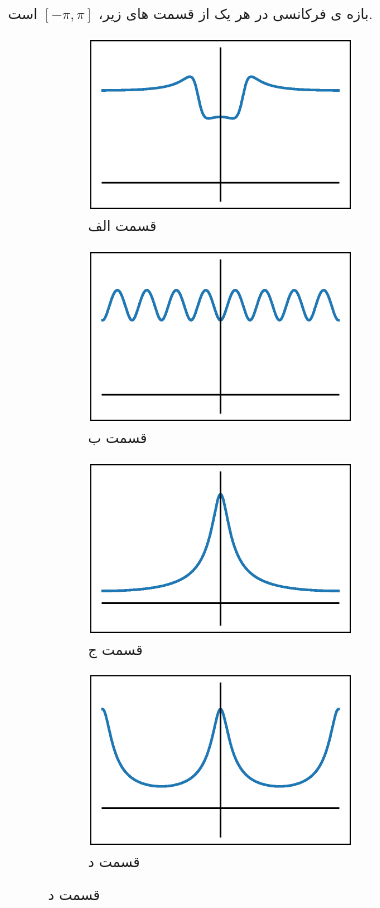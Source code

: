 \documentclass[10pt,letterpaper]{article}
\begin{document}
بازه ی فرکانسی در هر یک از قسمت های زیر، 
$
[-\pi,\pi]
$
 است.
\begin{figure}[h!]
\centering
\begin{subfigure}{0.49\textwidth}
\includegraphics[width=70mm]{PSol12_Q3_1.eps}
\caption{
قسمت الف
}
\end{subfigure}
\begin{subfigure}{0.49\textwidth}
\includegraphics[width=70mm]{PSol12_Q3_2.eps}
\caption{
قسمت ب
}
\end{subfigure}
\begin{subfigure}{0.49\textwidth}
\includegraphics[width=70mm]{PSol12_Q3_3.eps}
\caption{
قسمت ج
}
\end{subfigure}
\begin{subfigure}{0.49\textwidth}
\includegraphics[width=70mm]{PSol12_Q3_4.eps}
\caption{
قسمت د
}
\end{subfigure}
\end{figure}
\end{document}

